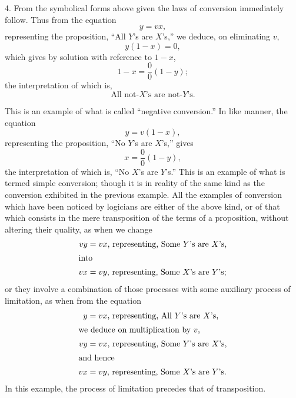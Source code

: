 \documentclass[oneside]{book}
\begin{document}
4. From the symbolical forms above given the laws of conversion
immediately follow. Thus from the equation
\[y = vx,\]
representing the proposition, ``All $Y$'s are $X$'s,'' we deduce, on
eliminating $v$,
\[y(1-x) = 0,\]
which gives by solution with reference to $1-x$,
\[1-x=\frac{0}{0}(1-y);\]
the interpretation of which is,
\[
\text{All not-$X$'s are not-$Y$'s.}
\]

This is an example of what is called ``negative conversion.''
In like manner, the equation
\[y = v(1-x),\]
representing the proposition, ``No $Y$'s are $X$'s,'' gives
\[x=\frac{0}{0}(1-y),\]
the interpretation of which is, ``No $X$'s are $Y$'s.'' This is an
example of what is termed simple conversion; though it is in reality
of the same kind as the conversion exhibited in the previous
example. All the examples of conversion which have been noticed
by logicians are either of the above kind, or of that which consists
in the mere transposition of the terms of a proposition, without
altering their quality, as when we change
\begin{align*}
  vy &= vx \textrm{, representing, Some $Y$'s are $X$'s,}   \\
\intertext{into}
  vx &= vy \textrm{, representing, Some $X$'s are $Y$'s;}
\end{align*}
or they involve a combination of those processes with some auxiliary
process of limitation, as when from the equation
\begin{align*}
  y &= vx \textrm{, representing, All $Y$'s are $X$'s,}   \\
\intertext{we deduce on multiplication by $v$,}
  vy &= vx \textrm{, representing, Some $Y$'s are $X$'s,}   \\
\intertext{and hence}
  vx &= vy \textrm{, representing, Some $X$'s are $Y$'s.}
\end{align*}
In this example, the process of limitation precedes that of
transposition.
\end{document}
